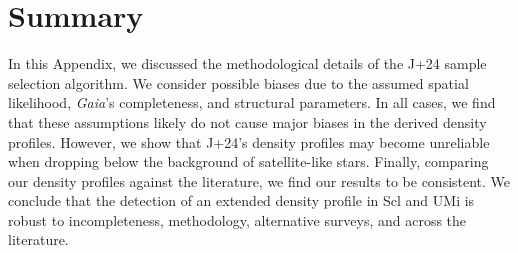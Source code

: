 \section{Summary}\label{summary}

In this Appendix, we discussed the methodological details of the J+24
sample selection algorithm. We consider possible biases due to the
assumed spatial likelihood, \emph{Gaia}'s completeness, and structural
parameters. In all cases, we find that these assumptions likely do not
cause major biases in the derived density profiles. However, we show
that J+24's density profiles may become unreliable when dropping below
the background of satellite-like stars. Finally, comparing our density
profiles against the literature, we find our results to be consistent.
We conclude that the detection of an extended density profile in Scl and
UMi is robust to incompleteness, methodology, alternative surveys, and
across the literature.
